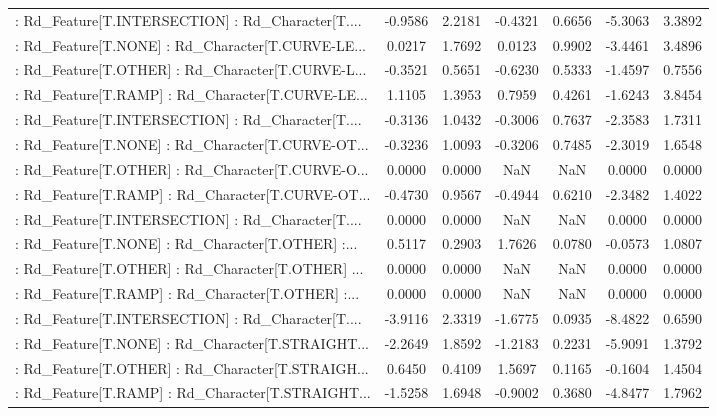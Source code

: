 \begin{longtable}{p{4cm}cccccc}
 : Rd\_Feature[T.INTERSECTION] : Rd\_Character[T.... & -0.9586 &    2.2181 & -0.4321 &       0.6656 & -5.3063 &  3.3892 \\
 : Rd\_Feature[T.NONE] : Rd\_Character[T.CURVE-LE... &  0.0217 &    1.7692 &  0.0123 &       0.9902 & -3.4461 &  3.4896 \\
 : Rd\_Feature[T.OTHER] : Rd\_Character[T.CURVE-L... & -0.3521 &    0.5651 & -0.6230 &       0.5333 & -1.4597 &  0.7556 \\
 : Rd\_Feature[T.RAMP] : Rd\_Character[T.CURVE-LE... &  1.1105 &    1.3953 &  0.7959 &       0.4261 & -1.6243 &  3.8454 \\
 : Rd\_Feature[T.INTERSECTION] : Rd\_Character[T.... & -0.3136 &    1.0432 & -0.3006 &       0.7637 & -2.3583 &  1.7311 \\
 : Rd\_Feature[T.NONE] : Rd\_Character[T.CURVE-OT... & -0.3236 &    1.0093 & -0.3206 &       0.7485 & -2.3019 &  1.6548 \\
 : Rd\_Feature[T.OTHER] : Rd\_Character[T.CURVE-O... &  0.0000 &    0.0000 &     NaN &          NaN &  0.0000 &  0.0000 \\
 : Rd\_Feature[T.RAMP] : Rd\_Character[T.CURVE-OT... & -0.4730 &    0.9567 & -0.4944 &       0.6210 & -2.3482 &  1.4022 \\
 : Rd\_Feature[T.INTERSECTION] : Rd\_Character[T.... &  0.0000 &    0.0000 &     NaN &          NaN &  0.0000 &  0.0000 \\
 : Rd\_Feature[T.NONE] : Rd\_Character[T.OTHER] :... &  0.5117 &    0.2903 &  1.7626 &       0.0780 & -0.0573 &  1.0807 \\
 : Rd\_Feature[T.OTHER] : Rd\_Character[T.OTHER] ... &  0.0000 &    0.0000 &     NaN &          NaN &  0.0000 &  0.0000 \\
 : Rd\_Feature[T.RAMP] : Rd\_Character[T.OTHER] :... &  0.0000 &    0.0000 &     NaN &          NaN &  0.0000 &  0.0000 \\
 : Rd\_Feature[T.INTERSECTION] : Rd\_Character[T.... & -3.9116 &    2.3319 & -1.6775 &       0.0935 & -8.4822 &  0.6590 \\
 : Rd\_Feature[T.NONE] : Rd\_Character[T.STRAIGHT... & -2.2649 &    1.8592 & -1.2183 &       0.2231 & -5.9091 &  1.3792 \\
 : Rd\_Feature[T.OTHER] : Rd\_Character[T.STRAIGH... &  0.6450 &    0.4109 &  1.5697 &       0.1165 & -0.1604 &  1.4504 \\
 : Rd\_Feature[T.RAMP] : Rd\_Character[T.STRAIGHT... & -1.5258 &    1.6948 & -0.9002 &       0.3680 & -4.8477 &  1.7962 \\

\end{longtable}
